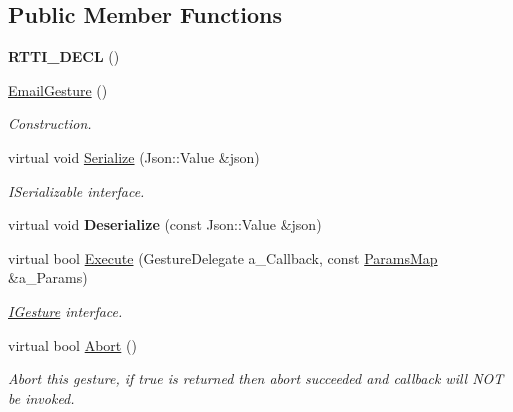 \subsection*{Public Member Functions}
\begin{DoxyCompactItemize}
\item 
\mbox{\label{class_email_gesture_ae05c88462a443fed845c9e36b170db93}} 
{\bfseries R\+T\+T\+I\+\_\+\+D\+E\+CL} ()
\item 
\mbox{\label{class_email_gesture_aaa22c0fd82be56f1689da3690bcdc1cb}} 
\hyperlink{class_email_gesture_aaa22c0fd82be56f1689da3690bcdc1cb}{Email\+Gesture} ()
\begin{DoxyCompactList}\small\item\em Construction. \end{DoxyCompactList}\item 
\mbox{\label{class_email_gesture_aa0f8b393736ada60de4aca24f4bfd9f5}} 
virtual void \hyperlink{class_email_gesture_aa0f8b393736ada60de4aca24f4bfd9f5}{Serialize} (Json\+::\+Value \&json)
\begin{DoxyCompactList}\small\item\em I\+Serializable interface. \end{DoxyCompactList}\item 
\mbox{\label{class_email_gesture_a40485b74138b09f1c6255ae85e4534ac}} 
virtual void {\bfseries Deserialize} (const Json\+::\+Value \&json)
\item 
\mbox{\label{class_email_gesture_a18514859abb88f7f9d3912ecf124300f}} 
virtual bool \hyperlink{class_email_gesture_a18514859abb88f7f9d3912ecf124300f}{Execute} (Gesture\+Delegate a\+\_\+\+Callback, const \hyperlink{class_params_map}{Params\+Map} \&a\+\_\+\+Params)
\begin{DoxyCompactList}\small\item\em \hyperlink{class_i_gesture}{I\+Gesture} interface. \end{DoxyCompactList}\item 
\mbox{\label{class_email_gesture_a0cab4ae66bb888460d9a5fd9505df490}} 
virtual bool \hyperlink{class_email_gesture_a0cab4ae66bb888460d9a5fd9505df490}{Abort} ()
\begin{DoxyCompactList}\small\item\em Abort this gesture, if true is returned then abort succeeded and callback will N\+OT be invoked. \end{DoxyCompactList}\end{DoxyCompactItemize}
